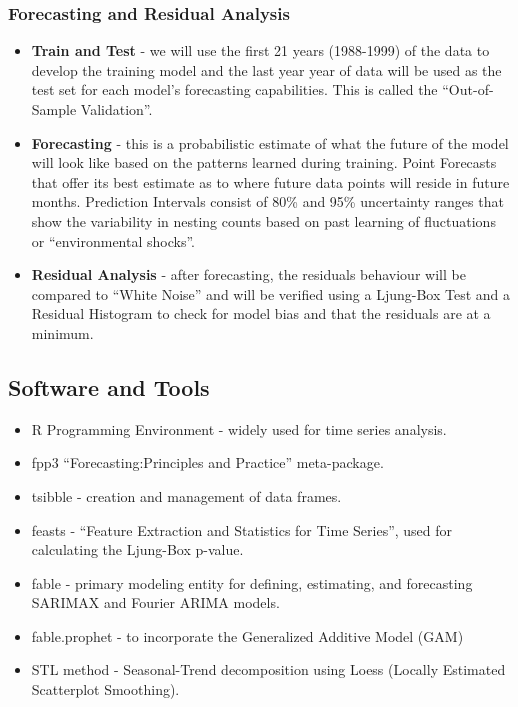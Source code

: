 \documentclass[
  letterpaper,
  DIV=11,
  numbers=noendperiod]{scrartcl}
\providecommand{\tightlist}{%
  \setlength{\itemsep}{0pt}\setlength{\parskip}{0pt}}\usepackage{longtable,booktabs,array}
\begin{document}
\subsubsection{Forecasting and Residual
Analysis}\label{forecasting-and-residual-analysis}

\begin{itemize}
\tightlist
\item
  \textbf{Train and Test} - we will use the first 21 years (1988-1999)
  of the data to develop the training model and the last year year of
  data will be used as the test set for each model's forecasting
  capabilities. This is called the ``Out-of-Sample Validation''.
\item
  \textbf{Forecasting} - this is a probabilistic estimate of what the
  future of the model will look like based on the patterns learned
  during training. Point Forecasts that offer its best estimate as to
  where future data points will reside in future months. Prediction
  Intervals consist of 80\% and 95\% uncertainty ranges that show the
  variability in nesting counts based on past learning of fluctuations
  or ``environmental shocks''.
\item
  \textbf{Residual Analysis} - after forecasting, the residuals
  behaviour will be compared to ``White Noise'' and will be verified
  using a Ljung-Box Test and a Residual Histogram to check for model
  bias and that the residuals are at a minimum.
\end{itemize}

\subsection{Software and Tools}\label{software-and-tools}

\begin{itemize}
\tightlist
\item
  R Programming Environment - widely used for time series analysis.
\item
  fpp3 ``Forecasting:Principles and Practice'' meta-package.
\item
  tsibble - creation and management of data frames.
\item
  feasts - ``Feature Extraction and Statistics for Time Series'', used
  for calculating the Ljung-Box p-value.
\item
  fable - primary modeling entity for defining, estimating, and
  forecasting SARIMAX and Fourier ARIMA models.
\item
  fable.prophet - to incorporate the Generalized Additive Model (GAM)
\item
  STL method - Seasonal-Trend decomposition using Loess (Locally
  Estimated Scatterplot Smoothing).
\end{itemize}
\end{document}
